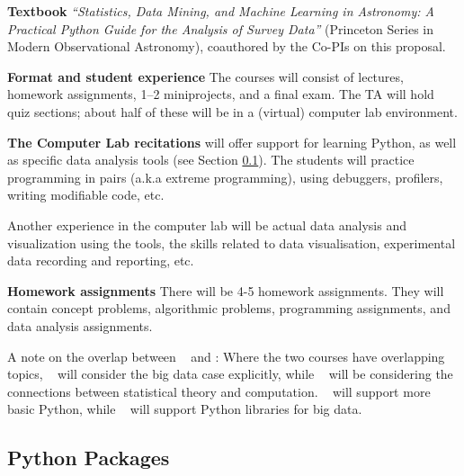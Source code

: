 {\bf Textbook} {\it ``Statistics, Data Mining, and Machine Learning in
  Astronomy: A Practical Python Guide for the Analysis of Survey
  Data''} (Princeton Series in Modern Observational Astronomy),  
coauthored by the Co-PIs on this proposal.

{\bf Format and student experience} 
The courses will consist of lectures, homework assignments, 1--2
miniprojects, and a final exam. The TA will hold quiz sections; about
half of these will be in a (virtual) computer lab environment. 

{\bf The Computer Lab recitations} will offer support for learning
Python, as well as specific data analysis tools (see Section \ref{sec:Python}).
The students will practice programming in pairs (a.k.a extreme
programming), using debuggers, profilers, writing modifiable code, etc.

Another experience in the computer lab will be actual data analysis
and visualization using the tools, the skills related to data
visualisation, experimental data recording and reporting, etc.

{\bf Homework assignments} There will be 4-5 homework
assignments. They will contain concept problems, algorithmic problems,
programming assignments, and data analysis assignments.

A note on the overlap between \statcl~ and \astrocl: Where the two
courses have overlapping topics, \astrocl~ will consider the big data case
explicitly, while \statcl~ will be considering the connections between
statistical theory and computation. \statcl~ will support more basic
Python, while \astrocl~ will support Python libraries for big data.


\subsection{Python Packages} 
\label{sec:Python}

